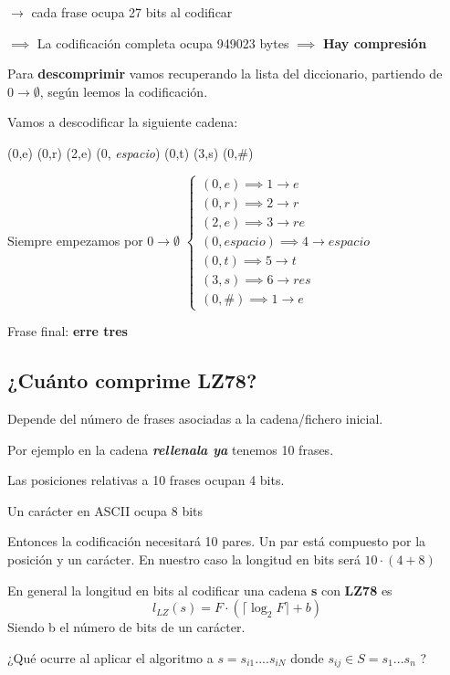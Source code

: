 $\rightarrow$  cada frase ocupa 27 bits al codificar

$\implies$ La codificación completa ocupa 949023 bytes $\implies$ \textbf{Hay compresión}

Para \textbf{descomprimir} vamos recuperando la lista del diccionario, partiendo de $0 \rightarrow \emptyset$, según leemos la codificación.

\begin{example}
Vamos a descodificar la siguiente cadena:

(0,e) (0,r) (2,e) (0, \textit{espacio}) (0,t) (3,s) (0,\#)

Siempre empezamos por $0 \rightarrow \emptyset$
$\begin{cases}
 (0,e) \implies 1 \rightarrow e\\
  (0,r) \implies 2 \rightarrow r\\
  (2,e) \implies 3 \rightarrow re\\
   (0, \textit{espacio}) \implies 4 \rightarrow \textit{espacio}\\
   (0,t) \implies 5 \rightarrow t\\
    (3,s) \implies 6 \rightarrow res\\
     (0,\#) \implies 1 \rightarrow e
\end{cases}$

Frase final: \textbf{erre tres}
\end{example}

\subsection{¿Cuánto comprime LZ78?}

Depende del número de frases asociadas a la cadena/fichero inicial.

Por ejemplo en la cadena \textbf{\textit{rellenala ya}} tenemos 10 frases.

Las posiciones relativas a 10 frases ocupan 4 bits.

Un carácter en ASCII ocupa 8 bits

Entonces la codificación necesitará 10 pares. Un par está compuesto por la posición y un carácter. En nuestro caso la longitud en bits será $10 \cdot (4 +8)$

En general la longitud en bits al codificar una cadena \textbf{s} con \textbf{LZ78} es
$$l_{LZ} (s) = F \cdot ( \lceil\log_2 F\rceil  + b)$$
Siendo b el número de bits de un carácter.


¿Qué ocurre al aplicar el algoritmo a $s = s_{i1}.... s_{iN}$ donde $s_{ij} \in S = {s_1...s_n}$ ?

